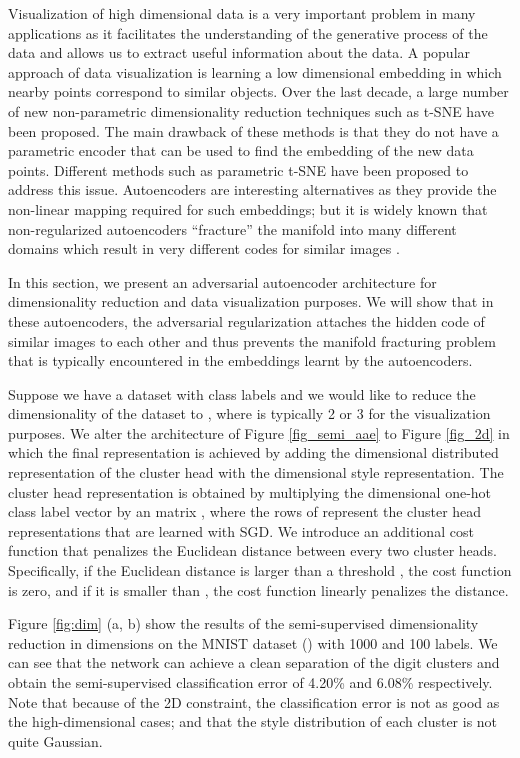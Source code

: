 \documentclass{article}
\begin{document}
Visualization of high dimensional data is a very important problem in many applications as it facilitates the understanding of the generative process of the data and allows us to extract useful information about the data. A popular approach of data visualization is learning a low dimensional embedding in which nearby points correspond to similar objects. Over the last decade, a large number of new non-parametric dimensionality reduction techniques such as t-SNE \citep{tsne} have been proposed. The main drawback of these methods is that they do not have a parametric encoder that can be used to find the embedding of the new data points. Different methods such as parametric t-SNE \citep{param_tsne} have been proposed to address this issue. Autoencoders are interesting alternatives as they provide the non-linear mapping required for such embeddings; but it is widely known that non-regularized autoencoders ``fracture'' the manifold into many different domains which result in very different codes for similar images \citep{geoff_dim_reduce}.

In this section, we present an adversarial autoencoder architecture for dimensionality reduction and data visualization purposes. We will show that in these autoencoders, the adversarial regularization attaches the hidden code of similar images to each other and thus prevents the manifold fracturing problem that is typically encountered in the embeddings learnt by the autoencoders. 

Suppose we have a dataset with  class labels and we would like to reduce the dimensionality of the dataset to , where  is typically 2 or 3 for the visualization purposes. 
We alter the architecture of Figure \ref{fig_semi_aae} to Figure \ref{fig_2d} in which the final representation is achieved by adding the  dimensional distributed representation of the cluster head with the  dimensional style representation. The cluster head representation is obtained by multiplying the  dimensional one-hot class label vector by an  matrix , where the rows of  represent the  cluster head representations that are learned with SGD. We introduce an additional cost function that penalizes the Euclidean distance between every two cluster heads. Specifically, if the Euclidean distance is larger than a threshold , the cost function is zero, and if it is smaller than , the cost function linearly penalizes the distance.

Figure \ref{fig:dim} (a, b) show the results of the semi-supervised dimensionality reduction in  dimensions on the MNIST dataset () with 1000 and 100 labels. We can see that the network can achieve a clean separation of the digit clusters and obtain the semi-supervised classification error of 4.20\% and 6.08\% respectively. Note that because of the 2D constraint, the classification error is not as good as the high-dimensional cases; and that the style distribution of each cluster is not quite Gaussian. 
\end{document}
